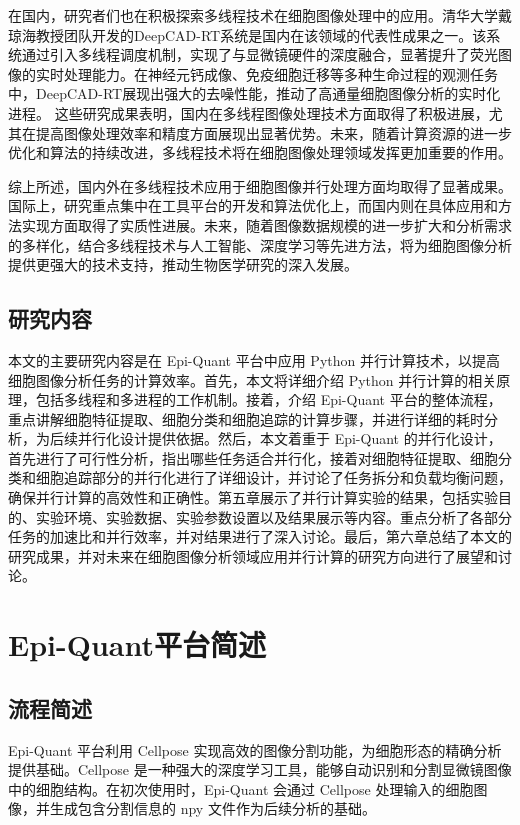 在国内，研究者们也在积极探索多线程技术在细胞图像处理中的应用。清华大学戴琼海教授团队开发的DeepCAD-RT系统是国内在该领域的代表性成果之一。该系统通过引入多线程调度机制，实现了与显微镜硬件的深度融合，显著提升了荧光图像的实时处理能力。在神经元钙成像、免疫细胞迁移等多种生命过程的观测任务中，DeepCAD-RT展现出强大的去噪性能，推动了高通量细胞图像分析的实时化进程\cite{ref11}。
这些研究成果表明，国内在多线程图像处理技术方面取得了积极进展，尤其在提高图像处理效率和精度方面展现出显著优势。未来，随着计算资源的进一步优化和算法的持续改进，多线程技术将在细胞图像处理领域发挥更加重要的作用。

综上所述，国内外在多线程技术应用于细胞图像并行处理方面均取得了显著成果。国际上，研究重点集中在工具平台的开发和算法优化上，而国内则在具体应用和方法实现方面取得了实质性进展。未来，随着图像数据规模的进一步扩大和分析需求的多样化，结合多线程技术与人工智能、深度学习等先进方法，将为细胞图像分析提供更强大的技术支持，推动生物医学研究的深入发展。
\subsection{研究内容}
本文的主要研究内容是在 Epi-Quant 平台中应用 Python 并行计算技术，以提高细胞图像分析任务的计算效率。首先，本文将详细介绍 Python 并行计算的相关原理，包括多线程和多进程的工作机制。接着，介绍 Epi-Quant 平台的整体流程，重点讲解细胞特征提取、细胞分类和细胞追踪的计算步骤，并进行详细的耗时分析，为后续并行化设计提供依据。然后，本文着重于 Epi-Quant 的并行化设计，首先进行了可行性分析，指出哪些任务适合并行化，接着对细胞特征提取、细胞分类和细胞追踪部分的并行化进行了详细设计，并讨论了任务拆分和负载均衡问题，确保并行计算的高效性和正确性。第五章展示了并行计算实验的结果，包括实验目的、实验环境、实验数据、实验参数设置以及结果展示等内容。重点分析了各部分任务的加速比和并行效率，并对结果进行了深入讨论。最后，第六章总结了本文的研究成果，并对未来在细胞图像分析领域应用并行计算的研究方向进行了展望和讨论。
\section{Epi-Quant平台简述}
\subsection{流程简述}
Epi-Quant 平台利用 Cellpose 实现高效的图像分割功能，为细胞形态的精确分析提供基础。Cellpose 是一种强大的深度学习工具，能够自动识别和分割显微镜图像中的细胞结构。在初次使用时，Epi-Quant 会通过 Cellpose 处理输入的细胞图像，并生成包含分割信息的 npy 文件作为后续分析的基础。

